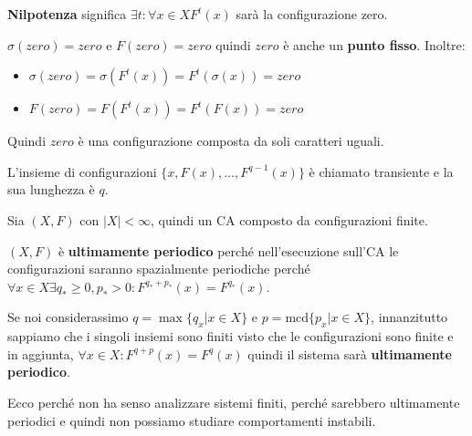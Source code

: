 \begin{definizione} 
    \textbf{Nilpotenza} significa $\exists t:\forall x\in X$$F^t(x)$ sarà la configurazione
    zero.
\end{definizione}

\begin{nota}
    $\sigma(zero) = zero$ e $F(zero) = zero$ quindi $zero$ è anche un \textbf{punto fisso}.
    Inoltre:
    \begin{itemize}
        \item $\sigma(zero) = \sigma(F^t(x)) = F^t(\sigma(x)) = zero$
        \item $F(zero) = F(F^t(x)) = F^t(F(x)) = zero$
    \end{itemize}
    Quindi $zero$ è una configurazione composta da soli caratteri uguali.
\end{nota}

L'insieme di configurazioni $\{x,F(x), \dots, F^{q-1}(x)\}$ è chiamato transiente
e la sua lunghezza è $q$.

\begin{nota}
    Sia $(X,F)$ con $|X|<\infty$, quindi un CA composto da configurazioni finite.

    $(X,F)$ è \textbf{ultimamente periodico} perché nell'esecuzione sull'CA le
    configurazioni saranno spazialmente periodiche perché
    $\forall x\in X\exists q_\ast \ge 0, p_\ast >0: F^{q_\ast +p_\ast}(x)=F^{q_\ast}(x)$.

    Se noi considerassimo $q=\max\{q_x|x\in X\}$ e $p=\text{mcd}\{p_x|x\in X\}$,
    innanzitutto sappiamo che i singoli insiemi sono finiti visto che le configurazioni
    sono finite e in aggiunta, $\forall x\in X:F^{q+p}(x)=F^{q}(x)$
    quindi il sistema sarà \textbf{ultimamente periodico}.
\end{nota}

Ecco perché non ha senso analizzare sistemi finiti, perché sarebbero ultimamente
periodici e quindi non possiamo studiare comportamenti instabili.

